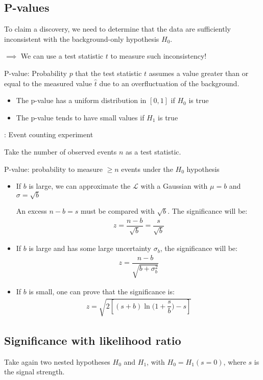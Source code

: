\subsection{P-values}
To claim a discovery, we need to determine that the data are sufficiently inconsistent with the background-only hypothesis $H_0$. 

$\implies$ We can use a test statistic $t$ to measure such inconsistency!

P-value: Probability $p$ that the test statistic $t$ assumes a value greater than or equal to the measured value $\hat{t}$ due to an overfluctuation of the background.

\begin{itemize}[$\to$]
  \item The p-value has a uniform distribution in $[0,1]$ if $H_0$ is true
  \item The p-value tends to have small values if $H_1$ is true
\end{itemize}

: Event counting experiment

Take the number of observed events $n$ as a test statistic. 

P-value: probability to measure $\geq n$ events under the $H_0$ hypothesis

\begin{itemize}[$\to$]
  \item If $b$ is large, we can approximate the $\mathcal{L}$ with a Gaussian with $\mu=b$ and $\sigma=\sqrt{b}$

    An excess $n-b=s$ must be compared with $\sqrt{b}$. The significance will be: 
    \begin{align}
      z= \dfrac{n-b}{\sqrt{b}} = \dfrac{s}{\sqrt{b}}
    \end{align}
  \item If $b$ is large and has some large uncertainty $\sigma_b$, the significance will be: 
    \begin{align}
      z = \dfrac{n-b}{\sqrt{b+\sigma_b^2}}
    \end{align}
  \item If $b$ is small, one can prove that the significance is: 
    \begin{align}
      z = \sqrt{2[(s+b)\ln\big(1 + \dfrac{s}{b}\big) - s]}
    \end{align}
\end{itemize}

\subsection{Significance with likelihood ratio}
Take again two nested hypotheses $H_0$ and $H_1$, with $H_0=H_1(s=0)$, where $s$ is the signal strength. 

